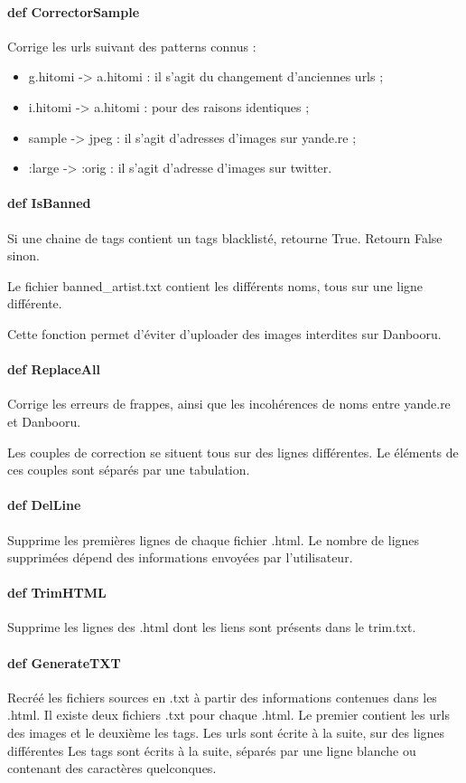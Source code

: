 \documentclass[a4paper,12pt]{article}
\begin{document}
\paragraph{def CorrectorSample}
Corrige les urls suivant des patterns connus :
\begin{itemize}
\item g.hitomi -> a.hitomi : il s'agit du changement d'anciennes urls ;
\item i.hitomi -> a.hitomi : pour des raisons identiques ;
\item sample -> jpeg : il s'agit d'adresses d'images sur yande.re ;
\item :large -> :orig : il s'agit d'adresse d'images sur twitter.
\end{itemize}
\paragraph{def IsBanned}
Si une chaine de tags contient un tags blacklisté, retourne True. Retourn False sinon. 

Le fichier banned\_artist.txt contient les différents noms, tous sur une ligne différente.

Cette fonction permet d'éviter d'uploader des images interdites sur Danbooru.
\paragraph{def ReplaceAll}
Corrige les erreurs de frappes, ainsi que les incohérences de noms entre yande.re et Danbooru.

Les couples de correction se situent tous sur des lignes différentes. Le éléments de ces couples sont séparés par une tabulation. 
\paragraph{def DelLine}
Supprime les premières lignes de chaque fichier .html. Le nombre de lignes supprimées dépend des informations envoyées par l'utilisateur.
\paragraph{def TrimHTML}
Supprime les lignes des .html dont les liens sont présents dans le trim.txt.
\paragraph{def GenerateTXT}
Recréé les fichiers sources en .txt à partir des informations contenues dans les .html. 
Il existe deux fichiers .txt pour chaque .html. Le premier contient les urls des images et le deuxième les tags.
Les urls sont écrite à la suite, sur des lignes différentes
Les tags sont écrits à la suite, séparés par une ligne blanche ou contenant des caractères quelconques.
\end{document}
